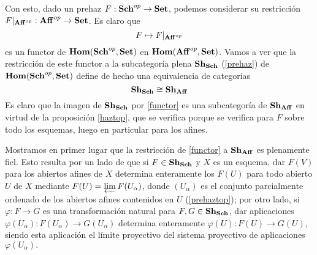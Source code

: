 \documentclass[twoside]{article}
\begin{document}
Con esto, dado un prehaz $F:\mathrm{\mathbf{Sch}}^{op}\to \mathrm{\mathbf{Set}}$, podemos considerar su restricción $F|_{\mathrm{\mathbf{Aff}}^{op}}:\mathrm{\mathbf{Aff}}^{op}\to\mathrm{\mathbf{Set}}$. Es claro que
\begin{equation}\label{functor}
F\mapsto F|_{\mathrm{\mathbf{Aff}}^{op}}
\end{equation}
es un functor de $\mathrm{\mathbf{Hom}}(\mathrm{\mathbf{Sch}}^{op},\mathrm{\mathbf{Set}})$ en $\mathrm{\mathbf{Hom}}(\mathrm{\mathbf{Aff}}^{op},\mathrm{\mathbf{Set}})$. Vamos a ver que la restricción de este functor a la subcategoría plena $\mathrm{\mathbf{Sh}}_{\mathrm{\mathbf{Sch}}}$ (\ref{prehaz}) de $\mathrm{\mathbf{Hom}}(\mathrm{\mathbf{Sch}}^{op},\mathrm{\mathbf{Set}})$ define de hecho una equivalencia de categorías 
\begin{equation}\label{equivalencia}
\mathrm{\mathbf{Sh}}_{\mathrm{\mathbf{Sch}}}\cong\mathrm{\mathbf{Sh}}_{\mathrm{\mathbf{Aff}}}
\end{equation}
Es claro que la imagen de $\mathrm{\mathbf{Sh}}_{\mathrm{\mathbf{Sch}}}$ por \ref{functor} es una subcategoría de $\mathrm{\mathbf{Sh}}_{\mathrm{\mathbf{Aff}}}$ en virtud de la proposición \ref{haztop}, que se verifica porque se verifica para $F$ sobre todo los esquemas, luego en particular para los afines. %

Mostramos en primer lugar que la restricción de \ref{functor} a $\mathrm{\mathbf{Sh}}_{\mathrm{\mathbf{Aff}}}$ es plenamente fiel. Esto resulta por un lado de que si $F\in \mathrm{\mathbf{Sh}}_{\mathrm{\mathbf{Sch}}}$ y $X$ es un esquema, dar $F(V)$ para los abiertos afines de $X$ determina enteramente los $F(U)$ para todo abierto $U$ de $X$ mediante $F(U)=\varprojlim F(U_\alpha)$, donde $(U_\alpha)$ es el conjunto parcialmente ordenado de los abiertos afines contenidos en $U$ (\ref{prehaztop}); %
 por otro lado, si $\varphi:F\to G$ es una transformación natural para $F,G\in \mathrm{\mathbf{Sh}}_{\mathrm{\mathbf{Sch}}}$, dar aplicaciones $\varphi(U_\alpha):F(U_\alpha)\to G(U_\alpha)$ determina enteramente $\varphi(U):F(U)\to G(U)$, siendo esta aplicación el límite proyectivo del sistema proyectivo de aplicaciones $\varphi(U_\alpha).$%
 
\end{document}
